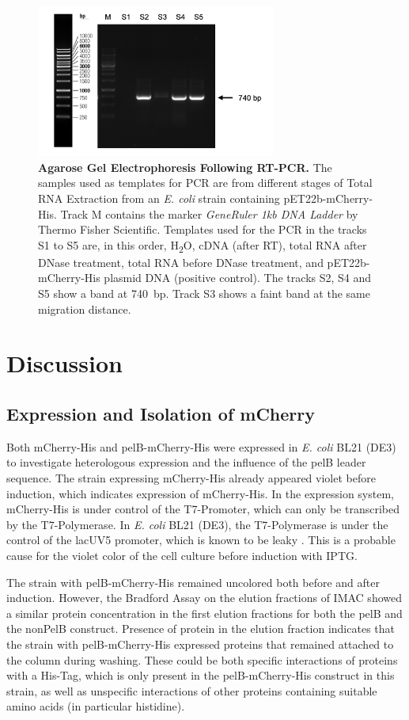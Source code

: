 \documentclass[a4paper,12pt]{article}
\begin{document}
\begin{figure}[h!]
    \centering
    \includegraphics[width=0.7\textwidth]{images/rna_post_pcr.png}
    \caption{\textbf{Agarose Gel Electrophoresis Following RT-PCR.} The samples used as templates for PCR are from different stages of Total RNA Extraction from an \emph{E. coli} strain containing pET22b-mCherry-His. Track M contains the marker \emph{GeneRuler 1kb DNA Ladder} by Thermo Fisher Scientific. Templates used for the PCR in the tracks S1 to S5 are, in this order, H\textsubscript{2}O, cDNA (after RT), total RNA after DNase treatment, total RNA before DNase treatment, and pET22b-mCherry-His plasmid DNA (positive control). The tracks S2, S4 and S5 show a band at 740~bp. Track S3 shows a faint band at the same migration distance.}
    \label{fig:rna2}
\end{figure}
\FloatBarrier
\section{Discussion}
\subsection{Expression and Isolation of mCherry}
Both mCherry-His and pelB-mCherry-His were expressed in \emph{E. coli} BL21 (DE3) to investigate heterologous expression and the influence of the pelB leader sequence. The strain expressing mCherry-His already appeared violet before induction, which indicates expression of mCherry-His. In the expression system, mCherry-His is under control of the T7-Promoter, which can only be transcribed by the T7-Polymerase. In \emph{E. coli} BL21 (DE3), the T7-Polymerase is under the control of the lacUV5 promoter, which is known to be leaky \cite{du2021regulating}. This is a probable cause for the violet color of the cell culture before induction with IPTG. 

The strain with pelB-mCherry-His remained uncolored both before and after induction. However, the Bradford Assay on the elution fractions of IMAC showed a similar protein concentration in the first elution fractions for both the pelB and  the nonPelB construct. Presence of protein in the elution fraction indicates that the strain with pelB-mCherry-His expressed proteins that remained attached to the column during washing. These could be both specific interactions of proteins with a His-Tag, which is only present in the pelB-mCherry-His construct in this strain, as well as unspecific interactions of other proteins containing suitable amino acids (in particular histidine).
\end{document}
